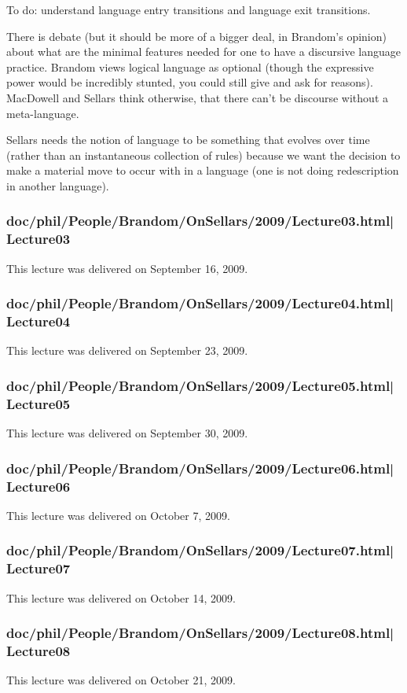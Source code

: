 \documentclass[12pt,a4paper]{report}
\begin{document}
To do: understand language entry transitions and language exit transitions.

There is debate (but it should be more of a bigger deal, in Brandom's opinion) about what are the minimal features needed for one to have a discursive language practice. Brandom views logical language as optional (though the expressive power would be incredibly stunted, you could still give and ask for reasons). MacDowell and Sellars think otherwise, that there can't be discourse without a meta-language.

Sellars needs the notion of language to be something that evolves over time (rather than an instantaneous collection of rules) because we want the decision to make a material move to occur with in a language (one is not doing redescription in another language).
\subsubsection{doc/phil/People/Brandom/OnSellars/2009/Lecture03.html|Lecture03}
This lecture was delivered on September 16, 2009.

\subsubsection{doc/phil/People/Brandom/OnSellars/2009/Lecture04.html|Lecture04}
This lecture was delivered on September 23, 2009.

\subsubsection{doc/phil/People/Brandom/OnSellars/2009/Lecture05.html|Lecture05}
This lecture was delivered on September 30, 2009.

\subsubsection{doc/phil/People/Brandom/OnSellars/2009/Lecture06.html|Lecture06}
This lecture was delivered on October 7, 2009.

\subsubsection{doc/phil/People/Brandom/OnSellars/2009/Lecture07.html|Lecture07}
This lecture was delivered on October 14, 2009.

\subsubsection{doc/phil/People/Brandom/OnSellars/2009/Lecture08.html|Lecture08}
This lecture was delivered on October 21, 2009.
\end{document}
